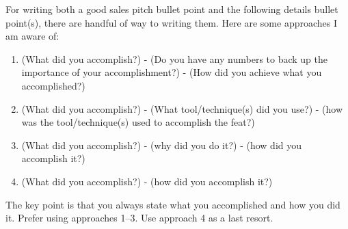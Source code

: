 \documentclass[letterpaper, 10pt]{article}
\begin{document}
\medskip

For writing both a good sales pitch bullet point and the following details
bullet point(s), there are handful of way to writing them. Here are some
approaches I am aware of:

\begin{enumerate}
    \item (What did you accomplish?) - (Do you have any numbers to back up the
        importance of your accomplishment?) - (How did you achieve what you
        accomplished?)
    \item (What did you accomplish?) - (What tool/technique(s) did you use?) -
        (how was the tool/technique(s) used to accomplish the feat?)
    \item (What did you accomplish?)  - (why did you do it?) - (how did you
        accomplish it?)
    \item (What did you accomplish?)  - (how did you accomplish it?)
\end{enumerate}

The key point is that you always state what you accomplished and how you did it.
Prefer using approaches 1--3. Use approach 4 as a last resort.
\end{document}
